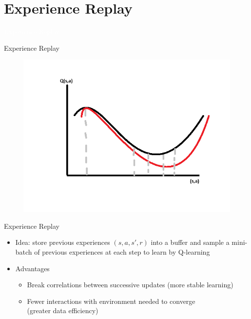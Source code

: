 \documentclass[11pt,table]{beamer}
\begin{document}
\section{Experience Replay}
{
\begin{frame}
\centering
\Huge
\textcolor{white}{Experience Replay}
\thispagestyle{empty}
\end{frame}
}


\begin{frame}{Experience Replay}
\begin{figure}
	\centering
		\includegraphics[width=1\textwidth]{figures/replay.png}
	\label{fig:replay}
\end{figure}

\end{frame}

\begin{frame}{Experience Replay}


\begin{itemize}
    \item Idea: store previous experiences $(s,a,s',r)$ into  a buffer and sample a mini-batch of previous experiences at each step to learn by Q-learning\\[2ex]

 \item Advantages
\begin{itemize}
    \item Break correlations between successive updates (more stable learning)
	\item Fewer interactions with environment needed to converge\\ (greater data efficiency)
 
\end{itemize} 
\end{itemize}
    
\end{frame}
\end{document}
